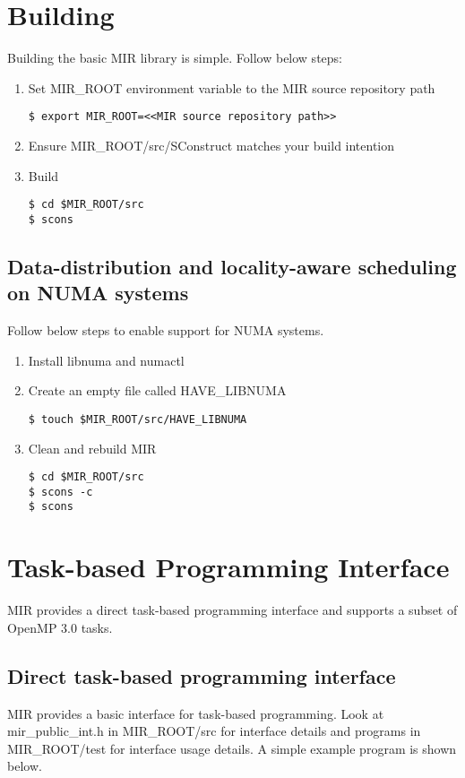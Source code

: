 \documentclass[11pt,a4paper,notitlepage]{article}
\begin{document}
\section{Building}
Building the basic MIR library is simple. Follow below steps:
\begin{enumerate}
\item Set MIR\_ROOT environment variable to the MIR source repository path
\begin{lstlisting}[style=BashInputStyle]
$ export MIR_ROOT=<<MIR source repository path>>
\end{lstlisting}
\item Ensure MIR\_ROOT/src/SConstruct matches your build intention
\item Build
\begin{lstlisting}[style=BashInputStyle]
$ cd $MIR_ROOT/src
$ scons 
\end{lstlisting}
\end{enumerate}

\subsection{Data-distribution and locality-aware scheduling on NUMA systems}
Follow below steps to enable support for NUMA systems.
\begin{enumerate}
\item Install libnuma and numactl
\item Create an empty file called HAVE\_LIBNUMA
\begin{lstlisting}[style=BashInputStyle]
$ touch $MIR_ROOT/src/HAVE_LIBNUMA
\end{lstlisting}
\item Clean and rebuild MIR
\begin{lstlisting}[style=BashInputStyle]
$ cd $MIR_ROOT/src
$ scons -c
$ scons 
\end{lstlisting}
\end{enumerate}

\section{Task-based Programming Interface}
MIR provides a direct task-based programming interface and supports a subset of OpenMP 3.0 tasks.

\subsection{Direct task-based programming interface}
MIR provides a basic interface for task-based programming. Look at mir\_public\_int.h in MIR\_ROOT/src for interface details and programs in MIR\_ROOT/test for interface usage details. A simple example program is shown below. 
\end{document}
